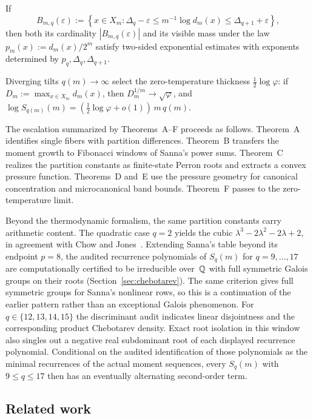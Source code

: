\begin{theoremE}
If
\[
  B_{m,q}(\varepsilon):=
  \left\{
    x\in X_m:
    \Delta_q-\varepsilon\le m^{-1}\log d_m(x)\le \Delta_{q+1}+\varepsilon
  \right\},
\]
then both its cardinality $|B_{m,q}(\varepsilon)|$ and its visible mass under
the law \(p_m(x):=d_m(x)/2^m\) satisfy two-sided exponential estimates with
exponents determined by $p_q,\Delta_q,\Delta_{q+1}$.
\end{theoremE}

\begin{theoremF}
Diverging tilts $q(m)\to\infty$ select the zero-temperature thickness
$\frac12\log\varphi$: if \(D_m:=\max_{x\in X_m}d_m(x)\), then
$D_m^{1/m}\to\sqrt{\varphi}$, and
$\log S_{q(m)}(m)=(\frac12\log\varphi+o(1))\,m\,q(m)$.
\end{theoremF}

\medskip\noindent
The escalation summarized by Theorems~A--F proceeds as follows.
Theorem~A identifies single fibers with partition differences.
Theorem~B transfers the moment growth to Fibonacci windows of Sanna's
power sums.  Theorem~C realizes the partition constants as finite-state
Perron roots and extracts a convex pressure function.  Theorems~D and~E
use the pressure geometry for canonical concentration and microcanonical
band bounds.  Theorem~F passes to the zero-temperature limit.

Beyond the thermodynamic formalism, the same partition constants carry
arithmetic content.  The quadratic case $q=2$ yields the cubic
$\lambda^3-2\lambda^2-2\lambda+2$, in agreement with Chow and
Jones~\cite{ChowJones2024}.  Extending Sanna's table beyond its endpoint
$p=8$, the audited recurrence polynomials of $S_q(m)$ for $q=9,\dots,17$ are
computationally certified to be irreducible over~$\mathbb{Q}$ with full symmetric
Galois groups on their roots (Section~\ref{sec:chebotarev}).  The same
criterion gives full symmetric groups for Sanna's nonlinear rows, so this is
a continuation of the earlier pattern rather than an exceptional Galois
phenomenon.  For $q\in\{12,13,14,15\}$ the discriminant audit indicates linear
disjointness and the corresponding product Chebotarev density.  Exact root
isolation in this window also singles out a negative real subdominant root of
each displayed recurrence polynomial.  Conditional on the
audited identification of those polynomials as the minimal recurrences of the
actual moment sequences, every $S_q(m)$ with $9\le q\le17$ then has an
eventually alternating second-order term.

\subsection{Related work}

